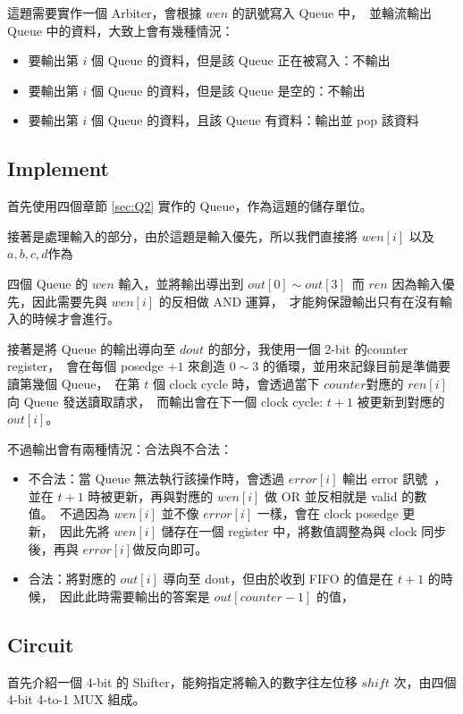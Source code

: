 \documentclass[10.5pt,compsoc,UTF8]{CjC}
\theoremstyle{mystyle}
\begin{document}
這題需要實作一個 Arbiter，會根據 $wen$ 的訊號寫入 Queue 中，\
並輪流輸出 Queue 中的資料，大致上會有幾種情況：
\begin{itemize}
  \item 要輸出第 $i$ 個 Queue 的資料，但是該 Queue 正在被寫入：不輸出
  \item 要輸出第 $i$ 個 Queue 的資料，但是該 Queue 是空的：不輸出
  \item 要輸出第 $i$ 個 Queue 的資料，且該 Queue 有資料：輸出並 pop 該資料
\end{itemize}

\subsection{Implement}
首先使用四個章節 \ref{sec:Q2} 實作的 Queue，作為這題的儲存單位。
\par
接著是處理輸入的部分，由於這題是輸入優先，所以我們直接將 $wen[i]$ 以及 $a, b, c, d$作為\

四個 Queue 的 $wen$ 輸入，並將輸出導出到 $out[0] \sim out[3]$\
而 $ren$ 因為輸入優先，因此需要先與 $wen[i]$ 的反相做 AND 運算，\
才能夠保證輸出只有在沒有輸入的時候才會進行。
\par
接著是將 Queue 的輸出導向至 $dout$ 的部分，我使用一個 2-bit 的counter register，\
會在每個 posedge $+1$ 來創造 $0 \sim 3$ 的循環，並用來記錄目前是準備要讀第幾個 Queue，\
在第 $t$ 個 clock cycle 時，會透過當下 $counter$對應的 $ren[i]$ 向 Queue 發送讀取請求，\
而輸出會在下一個 clock cycle: $t + 1$ 被更新到對應的 $out[i]$。
\par
不過輸出會有兩種情況：合法與不合法：
\begin{itemize}
  \item 不合法：當 Queue 無法執行該操作時，會透過 $error[i]$ 輸出 error 訊號\
  ，並在 $t + 1$ 時被更新，再與對應的 $wen[i]$ 做 OR 並反相就是 valid 的數值。\
  不過因為 $wen[i]$ 並不像 $error[i]$ 一樣，會在 clock posedge 更新，\
  因此先將 $wen[i]$ 儲存在一個 register 中，將數值調整為與 clock 同步後，再與 $error[i] 做反向即可$。
  \item 合法：將對應的 $out[i]$ 導向至 dout，但由於收到 FIFO 的值是在 $t + 1$ 的時候，\
  因此此時需要輸出的答案是 $out[counter - 1]$ 的值，\
  
\end{itemize}

\newpage
\subsection{Circuit}
首先介紹一個 4-bit 的 Shifter，能夠指定將輸入的數字往左位移 $shift$ 次，由四個 4-bit 4-to-1 MUX 組成。
\end{document}
